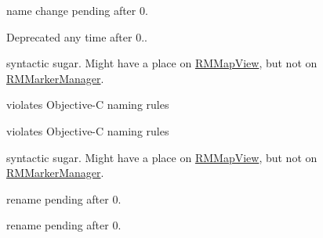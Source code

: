 \begin{DoxyRefList}
\item[\label{deprecated__deprecated000005}%
\hypertarget{deprecated__deprecated000005}{}%
成员 \hyperlink{protocol_r_m_map_contents_facade-p_a45d3b80e0d26fdce5ec55edd29df8aed}{\mbox{[}R\-M\-Map\-Contents\-Facade-\/p latitude\-Longitude\-Bounding\-Box\-For\-Screen\mbox{]}} ]name change pending after 0.  
\item[\label{deprecated__deprecated000010}%
\hypertarget{deprecated__deprecated000010}{}%
成员 \hyperlink{interface_r_m_map_view_adcd80394c57cbe77208bfc6726ff94dd}{\mbox{[}R\-M\-Map\-View init\-With\-Frame\-:With\-Location\-:\mbox{]}} ]Deprecated any time after 0..  
\item[\label{deprecated__deprecated000011}%
\hypertarget{deprecated__deprecated000011}{}%
成员 \hyperlink{interface_r_m_marker_manager_ad3403a9206e18ced0f63afdc17645726}{\mbox{[}R\-M\-Marker\-Manager hide\-All\-Markers\mbox{]}} ]syntactic sugar. Might have a place on \hyperlink{interface_r_m_map_view}{R\-M\-Map\-View}, but not on \hyperlink{interface_r_m_marker_manager}{R\-M\-Marker\-Manager}.  
\item[\label{deprecated__deprecated000013}%
\hypertarget{deprecated__deprecated000013}{}%
成员 \hyperlink{interface_r_m_marker_manager_a3460cd9600b65d6ec7f165382a1fc3f0}{\mbox{[}R\-M\-Marker\-Manager is\-Marker\-:within\-Bounds\-:\mbox{]}} ]violates Objective-\/\-C naming rules  
\item[\label{deprecated__deprecated000014}%
\hypertarget{deprecated__deprecated000014}{}%
成员 \hyperlink{interface_r_m_marker_manager_aafee5503808e606438d714ad7a1ed55b}{\mbox{[}R\-M\-Marker\-Manager managing\-Marker\-:\mbox{]}} ]violates Objective-\/\-C naming rules  
\item[\label{deprecated__deprecated000012}%
\hypertarget{deprecated__deprecated000012}{}%
成员 \hyperlink{interface_r_m_marker_manager_ac31f5340920245dd9b6a3068c720fee1}{\mbox{[}R\-M\-Marker\-Manager unhide\-All\-Markers\mbox{]}} ]syntactic sugar. Might have a place on \hyperlink{interface_r_m_map_view}{R\-M\-Map\-View}, but not on \hyperlink{interface_r_m_marker_manager}{R\-M\-Marker\-Manager}.  
\item[\label{deprecated__deprecated000016}%
\hypertarget{deprecated__deprecated000016}{}%
成员 \hyperlink{interface_r_m_projection_a857345e06858eef53abc8f464cb0f0f3}{\mbox{[}R\-M\-Projection lat\-Long\-To\-Point\-:\mbox{]}} ]rename pending after 0.  
\item[\label{deprecated__deprecated000015}%
\hypertarget{deprecated__deprecated000015}{}%
成员 \hyperlink{interface_r_m_projection_a85564cbd0ad54533588ddb55068c4b99}{\mbox{[}R\-M\-Projection point\-To\-Lat\-Long\-:\mbox{]}} ]rename pending after 0. 
\end{DoxyRefList}